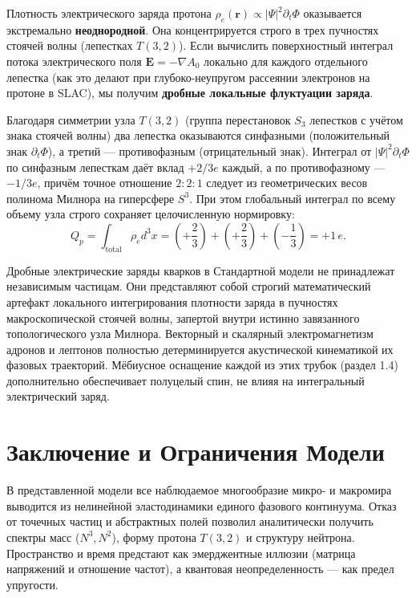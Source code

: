 \documentclass[11pt,a4paper]{article}
\begin{document}
Плотность электрического заряда протона $\rho_e(\mathbf{r}) \propto |\Psi|^2 \partial_t \Phi$ оказывается экстремально \textbf{неоднородной}. Она концентрируется строго в трех пучностях стоячей волны (лепестках $T(3,2)$). 
Если вычислить поверхностный интеграл потока электрического поля $\mathbf{E} = -\nabla A_0$ локально для каждого отдельного лепестка (как это делают при глубоко-неупругом рассеянии электронов на протоне в SLAC), мы получим \textbf{дробные локальные флуктуации заряда}. 

Благодаря симметрии узла $T(3,2)$ (группа перестановок $S_3$ лепестков с учётом знака стоячей волны) два лепестка оказываются синфазными (положительный знак $\partial_t \Phi$), а третий — противофазным (отрицательный знак). Интеграл от $|\Psi|^2 \partial_t \Phi$ по синфазным лепесткам даёт вклад $+2/3 e$ каждый, а по противофазному — $-1/3 e$, причём точное отношение $2:2:1$ следует из геометрических весов полинома Милнора на гиперсфере $S^3$. При этом глобальный интеграл по всему объему узла строго сохраняет целочисленную нормировку:
\begin{equation}
	Q_p = \int_{\text{total}} \rho_e d^3x = \left(+\frac{2}{3}\right) + \left(+\frac{2}{3}\right) + \left(-\frac{1}{3}\right) = +1\,e.
\end{equation}

Дробные электрические заряды кварков в Стандартной модели не принадлежат независимым частицам. Они представляют собой строгий математический артефакт локального интегрирования плотности заряда в пучностях макроскопической стоячей волны, запертой внутри истинно завязанного топологического узла Милнора. Векторный и скалярный электромагнетизм адронов и лептонов полностью детерминируется акустической кинематикой их фазовых траекторий. Мёбиусное оснащение каждой из этих трубок (раздел 1.4) дополнительно обеспечивает полуцелый спин, не влияя на интегральный электрический заряд.
	
	\section*{Заключение и Ограничения Модели}
	
	В представленной модели все наблюдаемое многообразие микро- и макромира выводится из нелинейной эластодинамики единого фазового континуума. Отказ от точечных частиц и абстрактных полей позволил аналитически получить спектры масс ($N^3, N^2$), форму протона $T(3,2)$ и структуру нейтрона. Пространство и время предстают как эмерджентные иллюзии (матрица напряжений и отношение частот), а квантовая неопределенность — как предел упругости.
	
\end{document}
